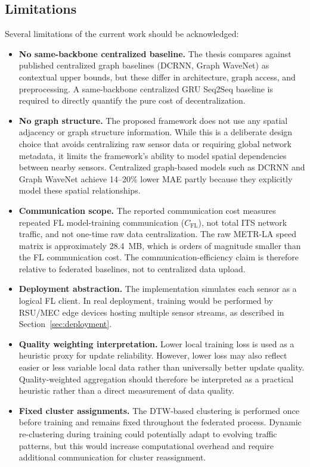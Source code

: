 \subsection{Limitations}
Several limitations of the current work should be acknowledged:
\begin{itemize}
    \item \textbf{No same-backbone centralized baseline.} The thesis compares against published centralized graph baselines (DCRNN, Graph WaveNet) as contextual upper bounds, but these differ in architecture, graph access, and preprocessing. A same-backbone centralized GRU Seq2Seq baseline is required to directly quantify the pure cost of decentralization.
    \item \textbf{No graph structure.} The proposed framework does not use any spatial adjacency or graph structure information. While this is a deliberate design choice that avoids centralizing raw sensor data or requiring global network metadata, it limits the framework's ability to model spatial dependencies between nearby sensors. Centralized graph-based models such as DCRNN and Graph WaveNet achieve 14--20\% lower MAE partly because they explicitly model these spatial relationships.
    \item \textbf{Communication scope.} The reported communication cost measures repeated FL model-training communication ($C_{\text{FL}}$), not total ITS network traffic, and not one-time raw data centralization. The raw METR-LA speed matrix is approximately 28.4~MB, which is orders of magnitude smaller than the FL communication cost. The communication-efficiency claim is therefore relative to federated baselines, not to centralized data upload.
    \item \textbf{Deployment abstraction.} The implementation simulates each sensor as a logical FL client. In real deployment, training would be performed by RSU/MEC edge devices hosting multiple sensor streams, as described in Section~\ref{sec:deployment}.
    \item \textbf{Quality weighting interpretation.} Lower local training loss is used as a heuristic proxy for update reliability. However, lower loss may also reflect easier or less variable local data rather than universally better update quality. Quality-weighted aggregation should therefore be interpreted as a practical heuristic rather than a direct measurement of data quality.
    \item \textbf{Fixed cluster assignments.} The DTW-based clustering is performed once before training and remains fixed throughout the federated process. Dynamic re-clustering during training could potentially adapt to evolving traffic patterns, but this would increase computational overhead and require additional communication for cluster reassignment.

\end{itemize}
